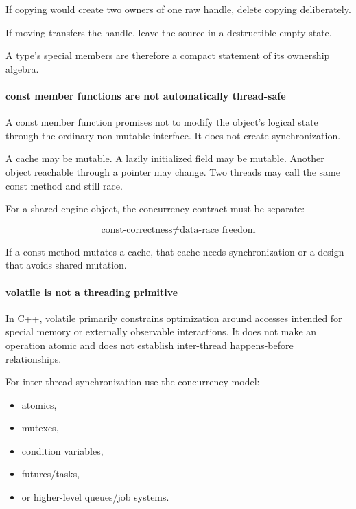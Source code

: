 If copying would create two owners of one raw handle, delete copying deliberately.

If moving transfers the handle, leave the source in a destructible empty state.

A type's special members are therefore a compact statement of its ownership algebra.

\paragraph{const member functions are not automatically thread-safe}\label{const-member-functions-are-not-automatically-thread-safe}

A const member function promises not to modify the object's logical state through the ordinary non-mutable interface. It does not create synchronization.

A cache may be mutable. A lazily initialized field may be mutable. Another object reachable through a pointer may change. Two threads may call the same const method and still race.

For a shared engine object, the concurrency contract must be separate:

\[
\boxed{
\text{const-correctness}
\neq
\text{data-race freedom}
}
\]

If a const method mutates a cache, that cache needs synchronization or a design that avoids shared mutation.

\paragraph{volatile is not a threading primitive}\label{volatile-is-not-a-threading-primitive}

In C++, volatile primarily constrains optimization around accesses intended for special memory or externally observable interactions. It does not make an operation atomic and does not establish inter-thread happens-before relationships.

For inter-thread synchronization use the concurrency model:

\begin{itemize}
\tightlist
\item
  atomics,
\item
  mutexes,
\item
  condition variables,
\item
  futures/tasks,
\item
  or higher-level queues/job systems.
\end{itemize}

